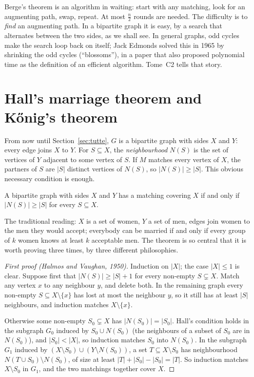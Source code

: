 Berge's theorem is an algorithm in waiting: start with any matching, look for an augmenting path, swap, repeat. At most
$\frac n2$ rounds are needed. The difficulty is to \emph{find} an augmenting path. In a bipartite graph it is easy, by a search
that alternates between the two sides, as we shall see. In general graphs, odd cycles make the search loop back on
itself; Jack Edmonds solved this in 1965 by shrinking the odd cycles (``blossoms''), in a paper that also proposed
polynomial time as the definition of an efficient algorithm. Tome~C2 tells that story.

\section{Hall's marriage theorem and K\H onig's theorem}

From now until Section~\ref{sec:tutte}, $G$ is a bipartite graph with sides $X$ and $Y$: every edge joins $X$ to $Y$. For $S\subseteq X$, the
\emph{neighbourhood} $N(S)$ is the set of vertices of $Y$ adjacent to some vertex of $S$. If $M$ matches every vertex of $X$, the partners of $S$ are
$|S|$ distinct vertices of $N(S)$, so $|N(S)|\ge|S|$. This obvious necessary condition is enough.

\begin{theorem}\label{thm:hall}
A bipartite graph with sides $X$ and $Y$ has a matching covering $X$ if and only if
$|N(S)|\ge|S|$ for every $S\subseteq X$.
\end{theorem}

The traditional reading: $X$ is a set of women, $Y$ a set of men, edges join women to the men they would accept; everybody can be
married if and only if every group of $k$ women knows at least $k$ acceptable men. The theorem is so central that it is worth
proving three times, by three different philosophies.

\begin{proof}[First proof (Halmos and Vaughan, 1950)]
Induction on $|X|$; the case $|X|\le1$ is clear. Suppose first that $|N(S)|\ge|S|+1$ for every non-empty $S\subsetneq X$. Match any
vertex $x$ to any neighbour $y$, and delete both. In the remaining graph every non-empty $S\subseteq X\setminus\{x\}$ has lost at most the
neighbour $y$, so it still has at least $|S|$ neighbours, and induction matches $X\setminus\{x\}$.

Otherwise some non-empty $S_0\subsetneq X$ has $|N(S_0)|=|S_0|$. Hall's condition holds in the subgraph $G_0$ induced by $S_0\cup N(S_0)$
(the neighbours of a subset of $S_0$ are in $N(S_0)$), and $|S_0|<|X|$, so induction matches $S_0$ into $N(S_0)$. In the subgraph $G_1$ induced by
$(X\setminus S_0)\cup(Y\setminus N(S_0))$, a set $T\subseteq X\setminus S_0$ has neighbourhood $N(T\cup S_0)\setminus N(S_0)$, of size at least
$|T|+|S_0|-|S_0|=|T|$. So induction matches $X\setminus S_0$ in $G_1$, and the two matchings together cover $X$.
\end{proof}

